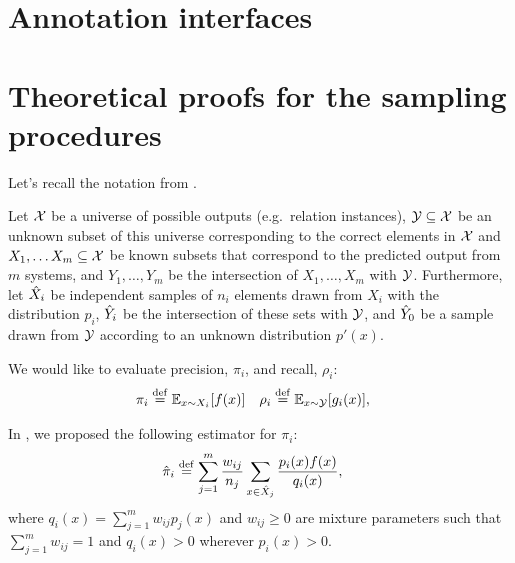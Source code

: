 \onecolumn
\section{Annotation interfaces}
\label{sec:interface}

\section{Theoretical proofs for the sampling procedures}
\label{sec:sampling}

Let's recall the notation from .

Let $\mathcal{X}$ be a universe of possible outputs (e.g.\ relation instances),
  $\mathcal{Y} \subseteq \mathcal{X}$ be an unknown subset of this universe corresponding to the correct elements in $\mathcal{X}$ and
  $X_1, \ldots X_m \subseteq \mathcal{X}$ be known subsets that correspond to the predicted output from $m$ systems,
  and $Y_1, \ldots, Y_m$ be the intersection of $X_1, \ldots, X_m$ with $\mathcal{Y}$.
Furthermore, 
  let ${\hat{X}}_i$ be independent samples of $n_i$ elements drawn from $X_i$ with the distribution $p_i$,
  ${\hat{Y}}_i$ be the intersection of these sets with $\mathcal{Y}$, and
  ${\hat{Y}}_0$ be a sample drawn from $\mathcal{Y}$ according to an unknown distribution $p'(x)$.

We would like to evaluate precision, $\pi_i$, and recall, $\rho_i$:
\begin{align*}
  \pi_i  &\stackrel{\rm def}{=} \mathbb{E}_{x \sim X_i}[f(x)] &
  \rho_i &\stackrel{\rm def}{=} \mathbb{E}_{x \sim \mathcal{Y}}[g_i(x)],
\end{align*}

In , we proposed the following estimator for $\pi_i$:
\begin{align*}
  {\hat{\pi}}_i &\stackrel{\rm def}{=} \sum_{j=1}^m \frac{w_{ij}}{n_j} \sum_{x \in {\hat{X}}_j} \frac{p_i(x) f(x)}{q_i(x)},
\end{align*}
where $q_i(x) = \sum_{j=1}^m w_{ij} p_j(x)$ and $w_{ij} \ge 0$ are mixture parameters such that $\sum_{j=1}^m w_{ij} = 1$ and $q_i(x) > 0$ wherever $p_i(x) > 0$.

